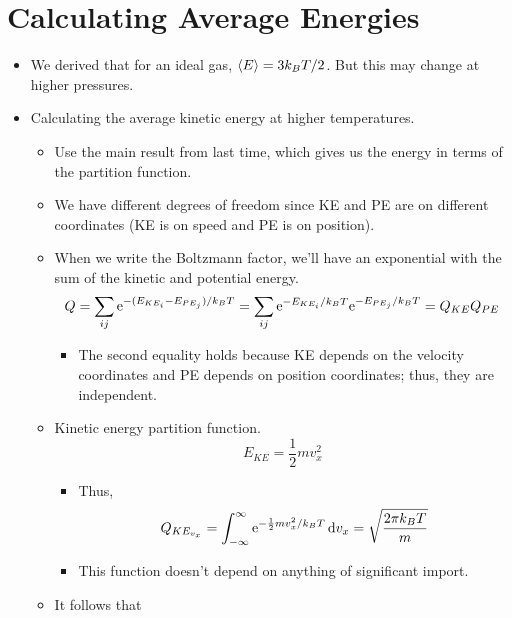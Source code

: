 \documentclass[../notes.tex]{subfiles}
\begin{document}
\section{Calculating Average Energies}
\begin{itemize}
    \item {}We derived that for an ideal gas, $\prb{E}=3k_BT/2$. But this may change at higher pressures.
    \item Calculating the average kinetic energy at higher temperatures.
    \begin{itemize}
        \item Use the main result from last time, which gives us the energy in terms of the partition function.
        \item We have different degrees of freedom since KE and PE are on different coordinates (KE is on speed and PE is on position).
        \item When we write the Boltzmann factor, we'll have an exponential with the sum of the kinetic and potential energy.
        \begin{equation*}
            Q = \sum_{ij}\e[-(E_{KE_i}-E_{PE_j})/k_BT]
            = \sum_{ij}\e[-E_{KE_i}/k_BT]\e[-E_{PE_j}/k_BT]
            = Q_{KE}Q_{PE}
        \end{equation*}
        \begin{itemize}
            \item The second equality holds because KE depends on the velocity coordinates and PE depends on position coordinates; thus, they are independent.
        \end{itemize}
        \item Kinetic energy partition function.
        \begin{equation*}
            E_{KE} = \frac{1}{2}mv_x^2
        \end{equation*}
        \begin{itemize}
            \item Thus,
            \begin{equation*}
                Q_{KE_{v_x}} = \int_{-\infty}^\infty\e[-\frac{1}{2}mv_x^2/k_BT]\dd{v_x} = \sqrt{\frac{2\pi k_BT}{m}}
            \end{equation*}
            \item This function doesn't depend on anything of significant import.
        \end{itemize}
        \item It follows that
        \begin{equation*}

\end{equation*}
\end{itemize}
\end{itemize}
\end{document}

